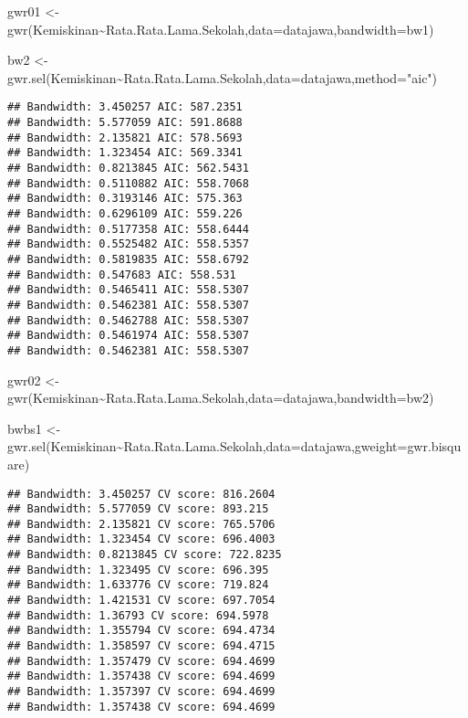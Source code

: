 \documentclass[
]{book}
\newenvironment{Shaded}{\begin{snugshade}}{\end{snugshade}}
\newcommand{\AttributeTok}[1]{\textcolor[rgb]{0.77,0.63,0.00}{#1}}
\newcommand{\FunctionTok}[1]{\textcolor[rgb]{0.00,0.00,0.00}{#1}}
\newcommand{\NormalTok}[1]{#1}
\newcommand{\OtherTok}[1]{\textcolor[rgb]{0.56,0.35,0.01}{#1}}
\newcommand{\SpecialCharTok}[1]{\textcolor[rgb]{0.00,0.00,0.00}{#1}}
\newcommand{\StringTok}[1]{\textcolor[rgb]{0.31,0.60,0.02}{#1}}
\begin{document}
\begin{Shaded}
\begin{Highlighting}[]
\NormalTok{gwr01 }\OtherTok{\textless{}{-}} \FunctionTok{gwr}\NormalTok{(Kemiskinan}\SpecialCharTok{\textasciitilde{}}\NormalTok{Rata.Rata.Lama.Sekolah,}\AttributeTok{data=}\NormalTok{datajawa,}\AttributeTok{bandwidth=}\NormalTok{bw1)}

\NormalTok{bw2 }\OtherTok{\textless{}{-}} \FunctionTok{gwr.sel}\NormalTok{(Kemiskinan}\SpecialCharTok{\textasciitilde{}}\NormalTok{Rata.Rata.Lama.Sekolah,}\AttributeTok{data=}\NormalTok{datajawa,}\AttributeTok{method=}\StringTok{"aic"}\NormalTok{)}
\end{Highlighting}
\end{Shaded}

\begin{verbatim}
## Bandwidth: 3.450257 AIC: 587.2351 
## Bandwidth: 5.577059 AIC: 591.8688 
## Bandwidth: 2.135821 AIC: 578.5693 
## Bandwidth: 1.323454 AIC: 569.3341 
## Bandwidth: 0.8213845 AIC: 562.5431 
## Bandwidth: 0.5110882 AIC: 558.7068 
## Bandwidth: 0.3193146 AIC: 575.363 
## Bandwidth: 0.6296109 AIC: 559.226 
## Bandwidth: 0.5177358 AIC: 558.6444 
## Bandwidth: 0.5525482 AIC: 558.5357 
## Bandwidth: 0.5819835 AIC: 558.6792 
## Bandwidth: 0.547683 AIC: 558.531 
## Bandwidth: 0.5465411 AIC: 558.5307 
## Bandwidth: 0.5462381 AIC: 558.5307 
## Bandwidth: 0.5462788 AIC: 558.5307 
## Bandwidth: 0.5461974 AIC: 558.5307 
## Bandwidth: 0.5462381 AIC: 558.5307
\end{verbatim}

\begin{Shaded}
\begin{Highlighting}[]
\NormalTok{gwr02 }\OtherTok{\textless{}{-}} \FunctionTok{gwr}\NormalTok{(Kemiskinan}\SpecialCharTok{\textasciitilde{}}\NormalTok{Rata.Rata.Lama.Sekolah,}\AttributeTok{data=}\NormalTok{datajawa,}\AttributeTok{bandwidth=}\NormalTok{bw2)}

\NormalTok{bwbs1 }\OtherTok{\textless{}{-}} \FunctionTok{gwr.sel}\NormalTok{(Kemiskinan}\SpecialCharTok{\textasciitilde{}}\NormalTok{Rata.Rata.Lama.Sekolah,}\AttributeTok{data=}\NormalTok{datajawa,}\AttributeTok{gweight=}\NormalTok{gwr.bisquare)}
\end{Highlighting}
\end{Shaded}

\begin{verbatim}
## Bandwidth: 3.450257 CV score: 816.2604 
## Bandwidth: 5.577059 CV score: 893.215 
## Bandwidth: 2.135821 CV score: 765.5706 
## Bandwidth: 1.323454 CV score: 696.4003 
## Bandwidth: 0.8213845 CV score: 722.8235 
## Bandwidth: 1.323495 CV score: 696.395 
## Bandwidth: 1.633776 CV score: 719.824 
## Bandwidth: 1.421531 CV score: 697.7054 
## Bandwidth: 1.36793 CV score: 694.5978 
## Bandwidth: 1.355794 CV score: 694.4734 
## Bandwidth: 1.358597 CV score: 694.4715 
## Bandwidth: 1.357479 CV score: 694.4699 
## Bandwidth: 1.357438 CV score: 694.4699 
## Bandwidth: 1.357397 CV score: 694.4699 
## Bandwidth: 1.357438 CV score: 694.4699
\end{verbatim}
\end{document}
